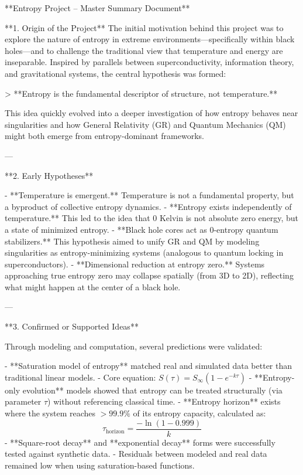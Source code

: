 **Entropy Project – Master Summary Document**

**1. Origin of the Project**
The initial motivation behind this project was to explore the nature of entropy in extreme environments—specifically within black holes—and to challenge the traditional view that temperature and energy are inseparable. Inspired by parallels between superconductivity, information theory, and gravitational systems, the central hypothesis was formed:

> **Entropy is the fundamental descriptor of structure, not temperature.**

This idea quickly evolved into a deeper investigation of how entropy behaves near singularities and how General Relativity (GR) and Quantum Mechanics (QM) might both emerge from entropy-dominant frameworks.

---

**2. Early Hypotheses**

- **Temperature is emergent.** Temperature is not a fundamental property, but a byproduct of collective entropy dynamics.
- **Entropy exists independently of temperature.** This led to the idea that 0 Kelvin is not absolute zero energy, but a state of minimized entropy.
- **Black hole cores act as 0-entropy quantum stabilizers.** This hypothesis aimed to unify GR and QM by modeling singularities as entropy-minimizing systems (analogous to quantum locking in superconductors).
- **Dimensional reduction at entropy zero.** Systems approaching true entropy zero may collapse spatially (from 3D to 2D), reflecting what might happen at the center of a black hole.

---

**3. Confirmed or Supported Ideas**

Through modeling and computation, several predictions were validated:

- **Saturation model of entropy** matched real and simulated data better than traditional linear models.
  - Core equation: \( S(\tau) = S_\infty (1 - e^{-k\tau}) \)
- **Entropy-only evolution** models showed that entropy can be treated structurally (via parameter \( \tau \)) without referencing classical time.
- **Entropy horizon** exists where the system reaches \( >99.9\% \) of its entropy capacity, calculated as:
  \[ \tau_{\text{horizon}} = \frac{-\ln(1 - 0.999)}{k} \]
- **Square-root decay** and **exponential decay** forms were successfully tested against synthetic data.
- Residuals between modeled and real data remained low when using saturation-based functions.

